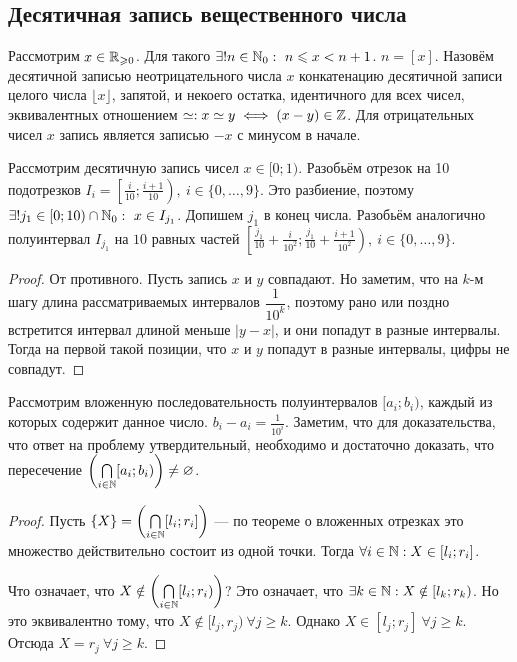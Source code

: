 \documentclass[a4paper]{report}
\begin{document}
    \subsection{Десятичная запись вещественного числа}
    Рассмотрим $x \in \mathbb{R}_{\geqslant 0}$.
    Для такого $\exists! n \in \mathbb{N}_0:~n \leqslant x < n + 1$. $n = [x]$.
    Назовём десятичной записью неотрицательного числа $x$ конкатенацию десятичной записи целого числа $\lfloor x \rfloor$, запятой, и некоего остатка, идентичного для всех чисел, эквивалентных отношением $\simeq: x \simeq y \iff (x - y) \in \mathbb{Z}$.
    Для отрицательных чисел $x$ запись является записью $-x$ с минусом в начале.

    Рассмотрим десятичную запись чисел $x \in [0; 1)$.
    Разобьём отрезок на 10 подотрезков $I_i = \left[\frac{i}{10}; \frac{i+1}{10}\right), ~ i \in \{0, \dots, 9\}$.
    Это разбиение, поэтому $\exists ! j_1 \in [0; 10) \cap \mathbb{N}_0 : ~ x \in I_{j_1}$.
    Допишем $j_1$ в конец числа.
    Разобьём аналогично полуинтервал $I_{j_1}$ на $10$ равных частей $\left[\frac{j_1}{10} + \frac{i}{10^2}; \frac{j_1}{10} + \frac{i + 1}{10^2}\right), ~ i \in \{ 0, \dots, 9\}$.

    \begin{proof}
        От противного.
        Пусть запись $x$ и $y$ совпадают.
        Но заметим, что на $k$-м шагу длина рассматриваемых интервалов $\dfrac{1}{10^k}$, поэтому рано или поздно встретится интервал длиной меньше $|y - x|$, и они попадут в разные интервалы.
        Тогда на первой такой позиции, что $x$ и $y$ попадут в разные интервалы, цифры не совпадут.
    \end{proof}

    Рассмотрим вложенную последовательность полуинтервалов $[a_i; b_i)$, каждый из которых содержит данное число. $b_i - a_i = \frac{1}{10^i}$.
    Заметим, что для доказательства, что ответ на проблему утвердительный, необходимо и достаточно доказать, что пересечение $\left(\underset{i \in \mathbb{N}}{\bigcap}[a_i; b_i)\right) \ne \varnothing$.

    \fact{Пусть задана последовательность вложенных полуинтервалов $[l_i, r_i) \ne \o$. Среди них есть сколь угодно малые. Пересечение этих полуинтервалов пусто $\iff \exist n \in \N: \forall i > n: r_i = r_n$.}
    \begin{proof}
        Пусть $\{X\} = \left(\underset{i \in \mathbb{N}}{\bigcap}[l_i; r_i]\right)$ --- по теореме о вложенных отрезках это множество действительно состоит из одной точки.
        Тогда $\forall i \in \mathbb{N} : X \in [l_i; r_i]$.

        Что означает, что $X \notin \left(\bigcap\limits_{i \in \mathbb{N}}[l_i; r_i)\right)$? Это означает, что $\exists k \in \mathbb{N}: X \notin [l_k; r_k)$.
        Но это эквивалентно тому, что $X \notin [l_j, r_j)~ \forall j \ge k$.
        Однако $X \in [l_j; r_j] ~\forall j \ge k$.
        Отсюда $X = r_j~\forall j \ge k$.
    \end{proof}
\end{document}
